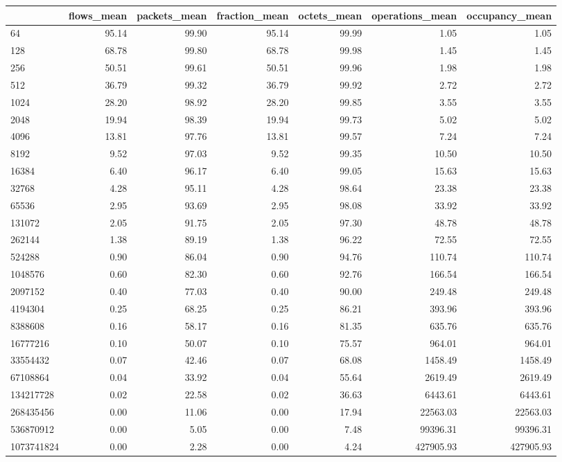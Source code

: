 \begin{tabular}{lrrrrrr}
\toprule
 & flows_mean & packets_mean & fraction_mean & octets_mean & operations_mean & occupancy_mean \\
\midrule
64 & 95.14 & 99.90 & 95.14 & 99.99 & 1.05 & 1.05 \\
128 & 68.78 & 99.80 & 68.78 & 99.98 & 1.45 & 1.45 \\
256 & 50.51 & 99.61 & 50.51 & 99.96 & 1.98 & 1.98 \\
512 & 36.79 & 99.32 & 36.79 & 99.92 & 2.72 & 2.72 \\
1024 & 28.20 & 98.92 & 28.20 & 99.85 & 3.55 & 3.55 \\
2048 & 19.94 & 98.39 & 19.94 & 99.73 & 5.02 & 5.02 \\
4096 & 13.81 & 97.76 & 13.81 & 99.57 & 7.24 & 7.24 \\
8192 & 9.52 & 97.03 & 9.52 & 99.35 & 10.50 & 10.50 \\
16384 & 6.40 & 96.17 & 6.40 & 99.05 & 15.63 & 15.63 \\
32768 & 4.28 & 95.11 & 4.28 & 98.64 & 23.38 & 23.38 \\
65536 & 2.95 & 93.69 & 2.95 & 98.08 & 33.92 & 33.92 \\
131072 & 2.05 & 91.75 & 2.05 & 97.30 & 48.78 & 48.78 \\
262144 & 1.38 & 89.19 & 1.38 & 96.22 & 72.55 & 72.55 \\
524288 & 0.90 & 86.04 & 0.90 & 94.76 & 110.74 & 110.74 \\
1048576 & 0.60 & 82.30 & 0.60 & 92.76 & 166.54 & 166.54 \\
2097152 & 0.40 & 77.03 & 0.40 & 90.00 & 249.48 & 249.48 \\
4194304 & 0.25 & 68.25 & 0.25 & 86.21 & 393.96 & 393.96 \\
8388608 & 0.16 & 58.17 & 0.16 & 81.35 & 635.76 & 635.76 \\
16777216 & 0.10 & 50.07 & 0.10 & 75.57 & 964.01 & 964.01 \\
33554432 & 0.07 & 42.46 & 0.07 & 68.08 & 1458.49 & 1458.49 \\
67108864 & 0.04 & 33.92 & 0.04 & 55.64 & 2619.49 & 2619.49 \\
134217728 & 0.02 & 22.58 & 0.02 & 36.63 & 6443.61 & 6443.61 \\
268435456 & 0.00 & 11.06 & 0.00 & 17.94 & 22563.03 & 22563.03 \\
536870912 & 0.00 & 5.05 & 0.00 & 7.48 & 99396.31 & 99396.31 \\
1073741824 & 0.00 & 2.28 & 0.00 & 4.24 & 427905.93 & 427905.93 \\
\bottomrule
\end{tabular}

